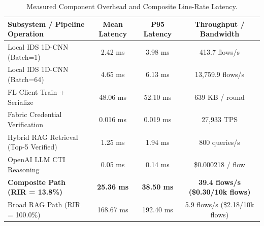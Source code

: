 \begin{table}[t]
\centering
\small
\caption{Measured Component Overhead and Composite Line-Rate Latency.}
\label{tab:systems_overhead}
\begin{tabular}{lccc}
\toprule
\textbf{Subsystem / Pipeline Operation} & \textbf{Mean Latency} & \textbf{P95 Latency} & \textbf{Throughput / Bandwidth} \\
\midrule
Local IDS 1D-CNN (Batch=1) & 2.42 ms & 3.98 ms & 413.7 flows/s \\
Local IDS 1D-CNN (Batch=64) & 4.65 ms & 6.13 ms & 13,759.9 flows/s \\
FL Client Train + Serialize & 48.06 ms & 52.10 ms & 639 KB / round \\
Fabric Credential Verification & 0.016 ms & 0.019 ms & 27,933 TPS \\
Hybrid RAG Retrieval (Top-5 Verified) & 1.25 ms & 1.94 ms & 800 queries/s \\
OpenAI LLM CTI Reasoning & 0.05 ms & 0.14 ms & \$0.000218 / flow \\
\midrule
\textbf{Composite Path (RIR = 13.8\%)} & \textbf{25.36 ms} & \textbf{38.50 ms} & \textbf{39.4 flows/s (\$0.30/10k flows)} \\
Broad RAG Path (RIR = 100.0\%) & 168.67 ms & 192.40 ms & 5.9 flows/s (\$2.18/10k flows) \\
\bottomrule
\end{tabular}
\end{table}
